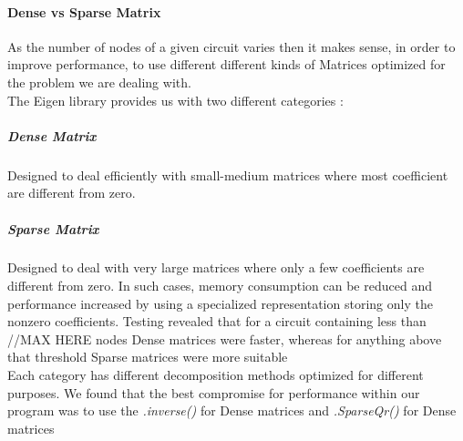 \documentclass{article}
\begin{document}
\paragraph{Dense vs Sparse Matrix}
As the number of nodes of a given circuit varies then it makes sense, in order to improve performance, to use different different kinds of Matrices optimized for the problem we are dealing with. \\
The Eigen library provides us with two different categories :
\subparagraph{Dense Matrix} Designed to deal efficiently with small-medium matrices where most coefficient are different from zero.
\subparagraph{Sparse Matrix} Designed to deal with very large matrices where only a few coefficients are different from zero. In such cases, memory consumption can be reduced and performance increased by using a specialized representation storing only the nonzero coefficients.\bigbreak
Testing revealed that for a circuit containing less than //MAX HERE nodes Dense matrices were faster, whereas for anything above that threshold Sparse matrices were more suitable \\
Each category has different decomposition methods optimized for different purposes. We found that the best compromise for performance within our program was to use the \textit{.inverse()} for Dense matrices and \textit{.SparseQr()} for Dense matrices





\newpage
\end{document}

